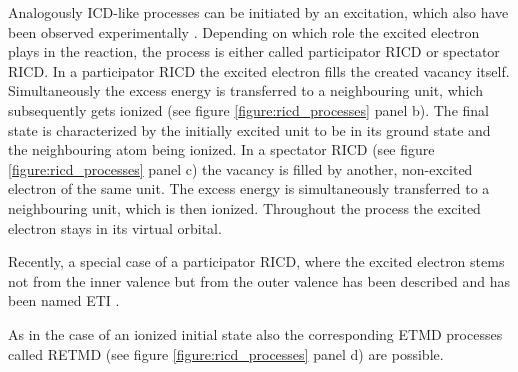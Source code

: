 Analogously ICD-like
processes can be initiated by an excitation, which also have been observed
experimentally \cite{Barth05,Gokhberg06,Kopelke09}.
Depending on which role the excited
electron plays in the reaction, the process is either called participator \ac{RICD}
or spectator \ac{RICD}.
In a participator \ac{RICD} the excited electron fills the created vacancy itself.
Simultaneously the excess energy is transferred to a neighbouring unit, which
subsequently gets ionized (see figure \ref{figure:ricd_processes} panel b).
The final state is characterized
by the initially excited unit to be in its ground state and the neighbouring atom
being ionized.
In a spectator \ac{RICD} (see figure \ref{figure:ricd_processes} panel c)
the vacancy is filled by another, non-excited electron
of the same unit. The excess energy is simultaneously transferred to a neighbouring
unit, which is then ionized. Throughout the process the excited electron stays
in its virtual orbital.

Recently, a special case of a participator \ac{RICD}, where the excited
electron stems not from the inner valence but from the outer valence
has been described and has been named \ac{ETI} \cite{Kopelke11}.

As in the case of an ionized initial state also the corresponding ETMD processes
called RETMD (see figure \ref{figure:ricd_processes} panel d) are possible.




